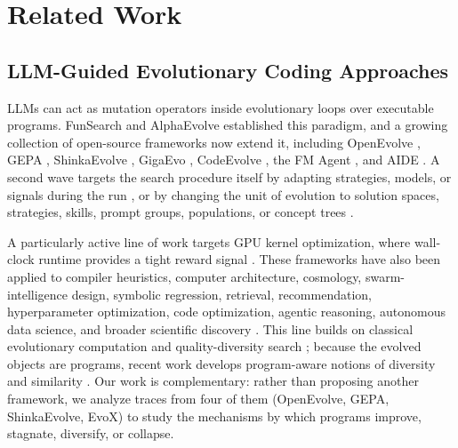 \section{Related Work}

\subsection{LLM-Guided Evolutionary Coding Approaches}
LLMs can act as mutation operators inside evolutionary loops over executable programs.
FunSearch \citep{romera-paredes2024} and AlphaEvolve \citep{novikov2025c,georgiev2025c} established this paradigm, and a growing collection of open-source frameworks now extend it, including OpenEvolve \citep{openevolve}, GEPA \citep{agrawal2026}, ShinkaEvolve \citep{lange2025b}, GigaEvo \citep{khrulkov2025}, CodeEvolve \citep{assumpcao2026}, the FM Agent \citep{li2026}, and AIDE \citep{jiang2025a}.
A second wave targets the search procedure itself by adapting strategies, models, or signals during the run \citep{liu2026,cemri2026,yan2026,ray2026,chen2026b}, or by changing the unit of evolution to solution spaces, strategies, skills, prompt groups, populations, or concept trees \citep{zhai2025,luo2026,ye2026,li2025c,zhang2025d,leleu2026,pourcel2026,wang2025a,yuksekgonul2026,ma2025,singhal2026,liu2026selfplayevolvesselfsyntheticpipeline}.

A particularly active line of work targets GPU kernel optimization, where wall-clock runtime provides a tight reward signal \citep{guo2025,wiedemann2026,cao2026,du2026,nichols2026,wei2025a,su2026,cheng2025a,cheng2025b}.
These frameworks have also been applied to compiler heuristics, computer architecture, cosmology, swarm-intelligence design, symbolic regression, retrieval, recommendation, hyperparameter optimization, code optimization, agentic reasoning, autonomous data science, and broader scientific discovery \citep{chen2026a,gupta2026,li2026a,cen2025,song2025,nian2026,wang2026a,ferreira2026,hu2026,zhou2026b,yang2025a,weng2026,skydiscover2026}.
This line builds on classical evolutionary computation and quality-diversity search \citep{koza1994,jaderberg2017,qian2024,nadizar2025,hughes2024}; because the evolved objects are programs, recent work develops program-aware notions of diversity and similarity \citep{friedman2023,zhang2026c}.
Our work is complementary: rather than proposing another framework, we analyze traces from four of them (OpenEvolve, GEPA, ShinkaEvolve, EvoX) to study the mechanisms by which programs improve, stagnate, diversify, or collapse.

